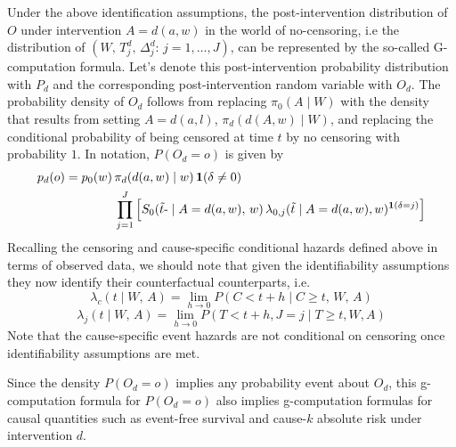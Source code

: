 \documentclass{report}
\newcommand{\1}{\ensuremath{\mathbf{1}}}
\renewcommand{\t}{\ensuremath{\Tilde{t}}}
\newcommand{\g}{\ensuremath{\pi}}
\renewcommand{\L}{\ensuremath{W}}
\renewcommand{\l}{\ensuremath{w}}
\begin{document}
Under the above identification assumptions, the post-intervention distribution of \(O\) under intervention \(A=d(a, \l)\) in the world of no-censoring, i.e the distribution of \((\L,\, T^d_j,\, \Delta^d_j :\, j = 1, \dots, J)\), can be represented by the so-called G-computation formula. Let’s denote this post-intervention probability distribution with \(P_{d}\) and the corresponding post-intervention random variable with \(O_d\). The probability density of \(O_d\) follows from replacing \(\g_0(A \mid \L)\) with the density that results from setting \(A = d(a, l)\), \(\g_d(d(A, \l) \mid \L)\), and replacing the conditional probability of being censored at time \(t\) by no censoring with probability \(1\). In notation, \(P(O_d = o)\) is given by
\begin{align*}
p_{d}(o) = p_{0}(\l) \, &\g_d(d(a, \l) \mid \l) \, \1(\delta \neq 0)\\
&\prod_{j=1}^{J} \left[S_{0}(\t\text{-} \mid A = d(a, \l),\, \l) \, \lambda_{0,j}(\t \mid A = d(a, \l), \l)^{\1(\delta = j)} \right]
\end{align*}
Recalling the censoring and cause-specific conditional hazards defined above in terms of observed data, we should note that given the identifiability assumptions they now identify their counterfactual counterparts, i.e. 
\[\lambda_{c}(t \mid W,\, A) = \lim_{h \to 0}P(C < t + h \mid C \geq t,\, W,\, A)\]
\[\lambda_{j}(t \mid W,\, A)= \lim_{h \to 0}P(T < t+h, J=j \mid T \geq t, W, A)\]
Note that the cause-specific event hazards are not conditional on censoring once identifiability assumptions are met.

Since the density \(P(O_d=o)\) implies any probability event about \(O_d\), this g-computation formula for \(P(O_d=o)\) also implies g-computation formulas for causal quantities such as event-free survival and cause-\(k\) absolute risk under intervention \(d\). 

\newpage


\end{document}
